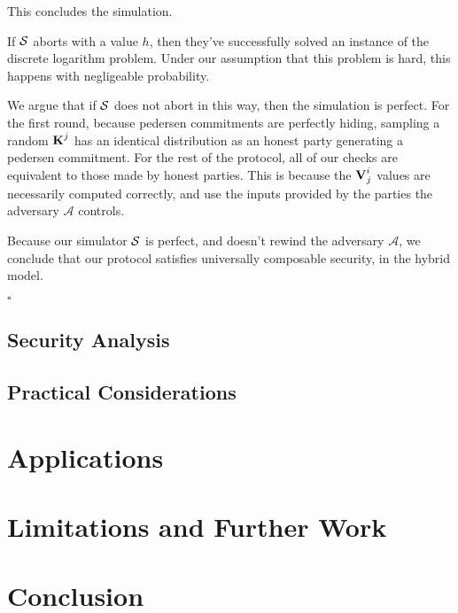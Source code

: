 This concludes the simulation.

If $\mathcal{S}$ aborts with a value $h$, then they've successfully
solved an instance of the discrete logarithm problem. Under our
assumption that this problem is hard, this happens with negligeable
probability.

We argue that if $\mathcal{S}$ does not abort in this way, then the simulation
is perfect. For the first round, because pedersen commitments
are perfectly hiding, sampling a random $\textbf{K}^j$ has an identical
distribution as an honest party generating a pedersen commitment.
For the rest of the protocol, all of our checks are equivalent
to those made by honest parties. This is because the
$\textbf{V}^i_j$ values are necessarily computed correctly, and use
the inputs provided by the parties the adversary $\mathcal{A}$ controls.

Because our simulator $\mathcal{S}$ is perfect, and doesn't
rewind the adversary $\mathcal{A}$, we conclude that our protocol
satisfies universally composable security, in the hybrid model.

$\square$

\subsection{Security Analysis}

\subsection{Practical Considerations}

\section{Applications}

\section{Limitations and Further Work}

\section{Conclusion}


\small 

